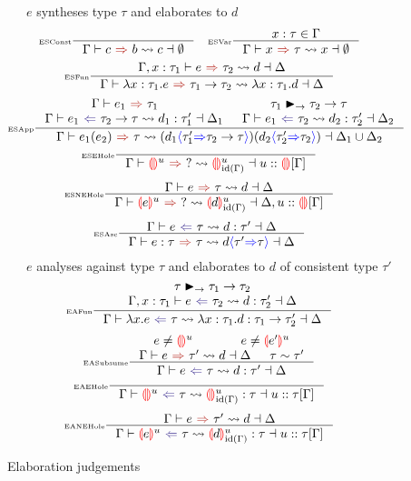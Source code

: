 \begin{figure}[H]
\small
{}\ \ \ $e$ syntheses type $\tau$ and elaborates to $d$
\tiny 
\[\inference[\tiny ESConst]{}{\elaborationSynthesis{c}{b}{c}{\emptyset}} \quad 
\inference[\tiny ESVar]{x : \tau \in \Gamma}{\elaborationSynthesis{x}{\tau}{x}{\emptyset}}\]
\[\inference[\tiny ESFun]{\elaborationSynthesis[\Gamma,x:\tau_1]{e}{\tau_2}{d}{\Delta}}{\elaborationSynthesis{\lambda x:\tau_1.e}{\tau_1 \to \tau_2}{\lambda x:\tau_1. d}{\Delta}}\]
\[\inference[\tiny ESApp]{\synthesis{e_1}{\tau_1} & \tau_1 \funmatch \tau_2 \to \tau \\ \elaborationAnalysis{e_1}{\tau_2 \to \tau}{d_1}{\tau_1'}{\Delta_1} & \elaborationAnalysis{e_1}{\tau_2}{d_2}{\tau_2'}{\Delta_2}}{\elaborationSynthesis{e_1(e_2)}{\tau}{(d_1\scast{\tau_1'}{\tau_2 \to \tau})(d_2\scast{\tau_2'}{\tau_2})}{\Delta_1 \cup \Delta_2}}\]
\[\inference[\tiny ESEHole]{}{\elaborationSynthesis{\hole^u}{?}{\hole^u_{\mathrm{id}(\Gamma)}}{u :: \hole[] [\Gamma]}}\]
\[\inference[\tiny ESNEHole]{\elaborationSynthesis{e}{\tau}{d}{\Delta}}{\elaborationSynthesis{\hole[e]^u}{?}{\hole[d]^u_{\mathrm{id}(\Gamma)}}{\Delta, u :: \hole[] [\Gamma]}}\]
\[\inference[\tiny ESAsc]{\elaborationAnalysis{e}{\tau}{d}{\tau'}{\Delta}}{\elaborationSynthesis{e:\tau}{\tau}{d\scast{\tau'}{\tau}}{\Delta}}\]
\small
{}\ \ \ $e$ analyses against type $\tau$ and elaborates to $d$ of consistent type $\tau'$
\tiny 
\[\inference[\tiny EAFun]{\tau \funmatch \tau_1 \to \tau_2 \\ \elaborationAnalysis[\Gamma,x:\tau_1]{e}{\tau_2}{d}{\tau_2'}{\Delta}}{\elaborationAnalysis{\lambda x. e}{\tau}{\lambda x:\tau_1. d}{\tau_1 \to \tau_2'}{\Delta}}\]
\[\inference[\tiny EASubsume]{e \neq \hole^u & e \neq \hole[e']^u \\ \elaborationSynthesis{e}{\tau'}{d}{\Delta} & \tau \sim \tau'}{\elaborationAnalysis{e}{\tau}{d}{\tau'}{\Delta}}\]
\[\inference[\tiny EAEHole]{}{\elaborationAnalysis{\hole^u}{\tau}{\hole^u_{\mathrm{id}(\Gamma)}}{\tau}{u::\tau[\Gamma]}}\]
\[\inference[\tiny EANEHole]{\elaborationSynthesis{e}{\tau'}{d}{\Delta}}{\elaborationAnalysis{\hole[e]^u}{\tau}{\hole[d]^u_{\mathrm{id}(\Gamma)}}{\tau}{u::\tau[\Gamma]}}\]

\caption{Elaboration judgements} 
\label{fig:elaboration}
\end{figure}

